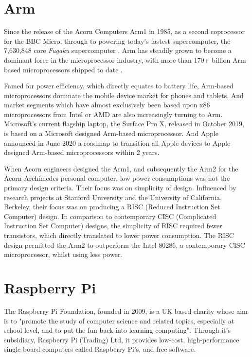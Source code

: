 %
%
\section{Arm}

Since the release of the Acorn Computers Arm1 in 1985, as a second coprocessor for the BBC Micro, through to powering today's fastest supercomputer, the 7,630,848 core \emph{Fugaku} supercomputer \cite{fujitsu-fugaku}, Arm has steadily grown to become a dominant force in the microprocessor industry, with more than 170+ billion Arm-based microprocessors shipped to date \cite{arm-fugaku}.

Famed for power efficiency, which directly equates to battery life, Arm-based microprocessors dominate the mobile device market for phones and tablets. And market segments which have almost exclusively been based upon x86 microprocessors from Intel or AMD are also increasingly turning to Arm. Microsoft's current flagship laptop, the Surface Pro X, released in October 2019, is based on a Microsoft designed Arm-based microprocessor. And Apple announced in June 2020 a roadmap to transition all Apple devices to Apple designed Arm-based microprocessors within 2 years.

When Acorn engineers designed the Arm1, and subsequently the Arm2 for the Acorn Archimedes personal computer, low power consumptions was not the primary design criteria. Their focus was on simplicity of design. Influenced by research projects \cite{risc} at Stanford University and the University of California, Berkeley, their focus was on producing a RISC (Reduced Instruction Set Computer) design. In comparison to contemporary CISC (Complicated Instruction Set Computer) designs, the simplicity of RISC  required fewer transistors, which directly translated to lower power consumption. The RISC design permitted the Arm2 to outperform the Intel 80286, a contemporary CISC microprocessor, whilst using less power. 


%
%
\section{Raspberry Pi}

The Raspberry Pi Foundation, founded in 2009, is a UK based charity whose aim is to "promote the study of computer science and related topics, especially at school level, and to put the fun back into learning computing". Through it's subsidiary, Raspberry Pi (Trading) Ltd, it provides low-cost, high-performance single-board computers called Raspberry Pi's, and free software.

